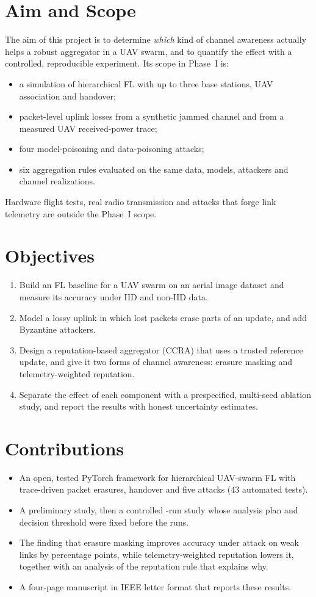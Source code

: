 \section{Aim and Scope}
The aim of this project is to determine \emph{which} kind of channel awareness
actually helps a robust aggregator in a UAV swarm, and to quantify the effect with a
controlled, reproducible experiment. Its scope in Phase~I is:
\begin{itemize}
\item a simulation of hierarchical FL with up to three base stations, UAV
  association and handover;
\item packet-level uplink losses from a synthetic jammed channel and from a measured
  UAV received-power trace;
\item four model-poisoning and data-poisoning attacks;
\item six aggregation rules evaluated on the same data, models, attackers and channel
  realizations.
\end{itemize}
Hardware flight tests, real radio transmission and attacks that forge link telemetry
are outside the Phase~I scope.

\section{Objectives}
\begin{enumerate}
\item Build an FL baseline for a UAV swarm on an aerial image dataset and measure its
  accuracy under IID and non-IID data.
\item Model a lossy uplink in which lost packets erase parts of an update, and add
  Byzantine attackers.
\item Design a reputation-based aggregator (CCRA) that uses a trusted reference
  update, and give it two forms of channel awareness: erasure masking and
  telemetry-weighted reputation.
\item Separate the effect of each component with a prespecified, multi-seed ablation
  study, and report the results with honest uncertainty estimates.
\end{enumerate}

\section{Contributions}
\begin{itemize}
\item An open, tested PyTorch framework for hierarchical UAV-swarm FL with
  trace-driven packet erasures, handover and five attacks (43 automated tests).
\item A preliminary study, then a controlled \NumRuns-run study whose analysis plan
  and decision threshold were fixed before the runs.
\item The finding that erasure masking improves accuracy under attack on weak links
  by \MaskGain{} percentage points, while telemetry-weighted reputation lowers it,
  together with an analysis of the reputation rule that explains why.
\item A four-page manuscript in IEEE letter format that reports these results.
\end{itemize}

